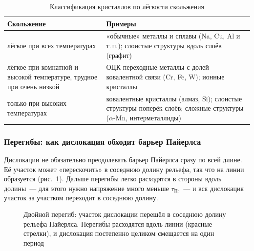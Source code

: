 \begin{table}[ht]
\centering
\caption{Классификация кристаллов по лёгкости скольжения}
\label{tab:peierls-classes}
\small
\begin{tabularx}{\textwidth}{@{}>{\raggedright\arraybackslash}p{38mm}>{\raggedright\arraybackslash}X@{}}
\toprule
Скольжение & Примеры \\
\midrule
лёгкое при всех температурах & «обычные» металлы и сплавы (Na, Cu, Al и т.\,п.);
  слоистые структуры вдоль слоёв (графит) \\
лёгкое при комнатной и высокой температуре, трудное при очень низкой &
  ОЦК переходные металлы с долей ковалентной связи (Cr, Fe, W); ионные кристаллы \\
только при высоких температурах & ковалентные кристаллы (алмаз, Si); слоистые
  структуры поперёк слоёв; сложные структуры ($\alpha$-Mn, интерметаллиды) \\
\bottomrule
\end{tabularx}
\end{table}

\subsubsection{Перегибы: как дислокация обходит барьер Пайерлса}

Дислокации не обязательно преодолевать барьер Пайерлса сразу по всей
длине. Её участок может «перескочить» в соседнюю долину рельефа, так что
на линии образуется  (рис.~\ref{fig:kinks}). Дальше
перегибы легко расходятся в стороны вдоль долины~— для этого нужно
напряжение много меньше $\tau_\text{П}$,~— и вся дислокация участок за
участком переходит в соседнюю долину.

\begin{figure}[ht]
\centering
{}
\caption{Двойной перегиб: участок дислокации перешёл в соседнюю долину
рельефа Пайерлса. Перегибы расходятся вдоль линии (красные стрелки), и
дислокация постепенно целиком смещается на один период}
\label{fig:kinks}
\end{figure}

